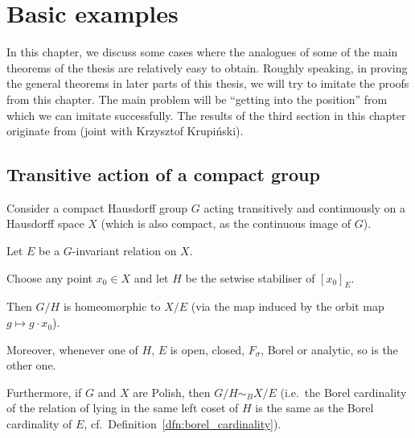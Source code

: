 
	\chapter{Basic examples}
	\label{chap:toy}
	In this chapter, we discuss some cases where the analogues of some of the main theorems of the thesis are relatively easy to obtain. Roughly speaking, in proving the general theorems in later parts of this thesis, we will try to imitate the proofs from this chapter. The main problem will be ``getting into the position'' from which we can imitate successfully. The results of the third section in this chapter originate from \cite{KR18} (joint with Krzysztof Krupiński).
	\section{Transitive action of a compact group}
	\begin{prop}
		\label{prop:toy_main}
		Consider a compact Hausdorff group $G$ acting transitively and continuously on a Hausdorff space $X$ (which is also compact, as the continuous image of $G$).
		
		Let $E$ be a $G$-invariant relation on $X$.
		
		Choose any point $x_0\in X$ and let $H$ be the setwise stabiliser of $[x_0]_E$.
		
		Then $G/H$ is homeomorphic to $X/E$ (via the map induced by the orbit map $g\mapsto g\cdot x_0$).
		
		Moreover, whenever one of $H$, $E$ is open, closed, $F_\sigma$, Borel or analytic, so is the other one.
		
		Furthermore, if $G$ and $X$ are Polish, then $G/H\sim_B X/E$ (i.e.\ the Borel cardinality of the relation of lying in the same left coset of $H$ is the same as the Borel cardinality of $E$, cf.\ Definition~\ref{dfn:borel_cardinality}).
	\end{prop}
